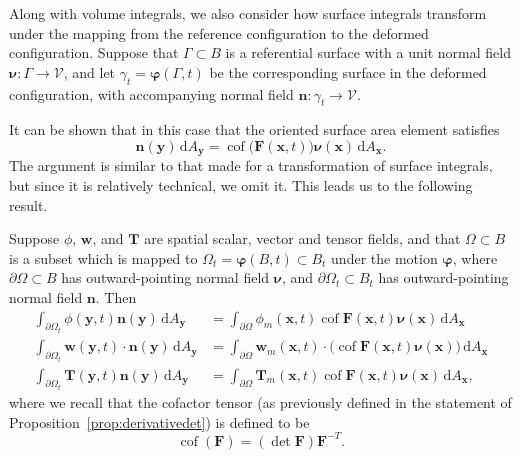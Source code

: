 \documentclass[
  letterpaper,
  DIV=11,
  numbers=noendperiod]{scrreprt}
\theoremstyle{plain}
\theoremstyle{remark}
\begin{document}
Along with volume integrals, we also consider how surface integrals
transform under the mapping from the reference configuration to the
deformed configuration. Suppose that \(\Gamma\subset B\) is a
referential surface with a unit normal field
\({\boldsymbol{\nu}}:\Gamma\to{\mathcal{V}}\), and let
\(\gamma_t = {\boldsymbol{\varphi}}(\Gamma,t)\) be the corresponding
surface in the deformed configuration, with accompanying normal field
\({\boldsymbol{n}}:\gamma_t\to{\mathcal{V}}\).

It can be shown that in this case that the oriented surface area element
satisfies
\[{\boldsymbol{n}}({\boldsymbol{y}}){\,{\mathrm{d}}A_{{\boldsymbol{y}}}}= {\operatorname{cof}}\big({\boldsymbol{F}}({\boldsymbol{x}},t)\big){\boldsymbol{\nu}}({\boldsymbol{x}}){\,{\mathrm{d}}A_{{\boldsymbol{x}}}}.\]
The argument is similar to that made for a transformation of surface
integrals, but since it is relatively technical, we omit it. This leads
us to the following result.

Suppose \(\phi\), \({\boldsymbol{w}}\), and \({\boldsymbol{T}}\) are
spatial scalar, vector and tensor fields, and that \(\Omega\subset B\)
is a subset which is mapped to
\(\Omega_t = {\boldsymbol{\varphi}}(B,t)\subset B_t\) under the motion
\({\boldsymbol{\varphi}}\), where \(\partial \Omega\subset B\) has
outward-pointing normal field \({\boldsymbol{\nu}}\), and
\(\partial\Omega_t\subset B_t\) has outward-pointing normal field
\({\boldsymbol{n}}\). Then \[\begin{aligned}
      \int_{\partial\Omega_t}\phi({\boldsymbol{y}},t){\boldsymbol{n}}({\boldsymbol{y}}){\,{\mathrm{d}}A_{{\boldsymbol{y}}}}&= \int_{\partial\Omega}\phi_m({\boldsymbol{x}},t){\operatorname{cof}}{\boldsymbol{F}}({\boldsymbol{x}},t){\boldsymbol{\nu}}({\boldsymbol{x}}){\,{\mathrm{d}}A_{{\boldsymbol{x}}}}\\
      \int_{\partial\Omega_t}{\boldsymbol{w}}({\boldsymbol{y}},t)\cdot {\boldsymbol{n}}({\boldsymbol{y}}){\,{\mathrm{d}}A_{{\boldsymbol{y}}}}&= \int_{\partial\Omega}{\boldsymbol{w}}_m({\boldsymbol{x}},t)\cdot\big({\operatorname{cof}}{\boldsymbol{F}}({\boldsymbol{x}},t){\boldsymbol{\nu}}({\boldsymbol{x}})\big){\,{\mathrm{d}}A_{{\boldsymbol{x}}}}\\
      \int_{\partial\Omega_t}{\boldsymbol{T}}({\boldsymbol{y}},t){\boldsymbol{n}}({\boldsymbol{y}}){\,{\mathrm{d}}A_{{\boldsymbol{y}}}}&= \int_{\partial\Omega}{\boldsymbol{T}}_m({\boldsymbol{x}},t){\operatorname{cof}}{\boldsymbol{F}}({\boldsymbol{x}},t){\boldsymbol{\nu}}({\boldsymbol{x}}){\,{\mathrm{d}}A_{{\boldsymbol{x}}}},
    \end{aligned}\] where we recall that the cofactor tensor (as
previously defined in the statement of
Proposition~\hyperref[prop:derivativedet]{{[}prop:derivativedet{]}}) is
defined to be
\[{\operatorname{cof}}({\boldsymbol{F}}) = (\det{\boldsymbol{F}}){\boldsymbol{F}}^{-T}.\]
\end{document}
